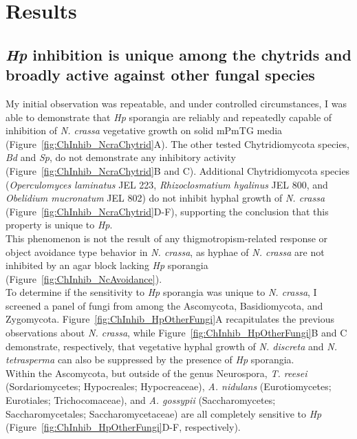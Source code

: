 \section{Results}

\subsection*{\textit{Hp} inhibition is unique among the chytrids and broadly active against other fungal species}
My initial observation was repeatable, and under controlled circumstances, I was able to demonstrate that \textit{Hp} sporangia are reliably and repeatedly capable of inhibition of \textit{N. crassa} vegetative growth on solid mPmTG media (Figure~\ref{fig:ChInhib_NcraChytrid}A). The other tested Chytridiomycota species, \textit{Bd} and \textit{Sp}, do not demonstrate any inhibitory activity (Figure~\ref{fig:ChInhib_NcraChytrid}B and C). Additional Chytridiomycota species (\textit{Operculomyces laminatus} JEL 223, \textit{Rhizoclosmatium hyalinus} JEL 800, and \textit{Obelidium mucronatum} JEL 802) do not inhibit hyphal growth of \textit{N. crassa} (Figure~\ref{fig:ChInhib_NcraChytrid}D-F), supporting the conclusion that this property is unique to \textit{Hp}. \\
\indent This phenomenon is not the result of any thigmotropism-related response or object avoidance type behavior in \textit{N. crassa}, as hyphae of \textit{N. crassa} are not inhibited by an agar block lacking \textit{Hp} sporangia (Figure~\ref{fig:ChInhib_NcAvoidance}).\\
\indent To determine if the sensitivity to \textit{Hp} sporangia was unique to \textit{N. crassa}, I screened a panel of fungi from among the Ascomycota, Basidiomycota, and Zygomycota. Figure~\ref{fig:ChInhib_HpOtherFungi}A recapitulates the previous observations about \textit{N. crassa}, while Figure~\ref{fig:ChInhib_HpOtherFungi}B and C demonstrate, respectively, that vegetative hyphal growth of \textit{N. discreta} and \textit{N. tetrasperma} can also be suppressed by the presence of \textit{Hp} sporangia.\\
\indent Within the Ascomycota, but outside of the genus Neurospora, \textit{T. reesei} (Sordariomycetes; Hypocreales; Hypocreaceae), \textit{A. nidulans} (Eurotiomycetes; Eurotiales; Trichocomaceae), and \textit{A. gossypii} (Saccharomycetes; Saccharomycetales; Saccharomycetaceae) are all completely sensitive to \textit{Hp} (Figure~\ref{fig:ChInhib_HpOtherFungi}D-F, respectively). \\
